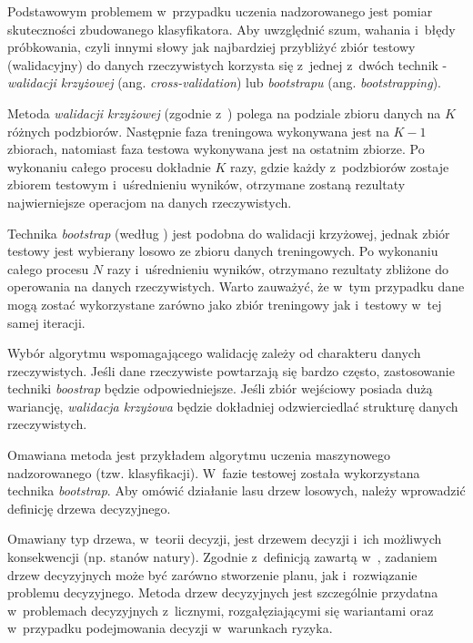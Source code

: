       Podstawowym problemem w~przypadku uczenia nadzorowanego jest pomiar skuteczności zbudowanego klasyfikatora. Aby uwzględnić szum, wahania i~błędy próbkowania, czyli innymi słowy jak najbardziej przybliżyć zbiór testowy (walidacyjny) do danych rzeczywistych korzysta się z~jednej z~dwóch technik - \textit{walidacji krzyżowej} (ang. \textit{cross-validation}) lub \textit{bootstrapu} (ang. \textit{bootstrapping}).

      Metoda \textit{walidacji krzyżowej} (zgodnie z~\cite{StatystyczneSystemyUczaceSie}) polega na podziale zbioru danych na $K$ różnych podzbiorów. Następnie faza treningowa wykonywana jest na $K-1$ zbiorach, natomiast faza testowa wykonywana jest na ostatnim zbiorze. Po wykonaniu całego procesu dokładnie $K$ razy, gdzie każdy z~podzbiorów zostaje zbiorem testowym i~uśrednieniu wyników, otrzymane zostaną rezultaty najwierniejsze operacjom na danych rzeczywistych.

      Technika \textit{bootstrap} (według \cite{StatystyczneSystemyUczaceSie}) jest podobna do walidacji krzyżowej, jednak zbiór testowy jest wybierany losowo ze zbioru danych treningowych. Po wykonaniu całego procesu $N$ razy i~uśrednieniu wyników, otrzymano rezultaty zbliżone do operowania na danych rzeczywistych. Warto zauważyć, że w~tym przypadku dane mogą zostać wykorzystane zarówno jako zbiór treningowy jak i~testowy w~tej samej iteracji.

      Wybór algorytmu wspomagającego walidację zależy od charakteru danych rzeczywistych. Jeśli dane rzeczywiste powtarzają się bardzo często, zastosowanie techniki \textit{boostrap} będzie odpowiedniejsze. Jeśli zbiór wejściowy posiada dużą wariancję, \textit{walidacja krzyżowa} będzie dokładniej odzwierciedlać strukturę danych rzeczywistych.

      Omawiana metoda jest przykładem algorytmu uczenia maszynowego nadzorowanego (tzw. klasyfikacji). W~fazie testowej została wykorzystana technika \textit{bootstrap}. Aby omówić działanie lasu drzew losowych, należy wprowadzić definicję drzewa decyzyjnego.

      Omawiany typ drzewa, w~teorii decyzji, jest drzewem decyzji i~ich możliwych konsekwencji (np. stanów natury). Zgodnie z~definicją zawartą w~\cite{RealTimeRandomizedTrees05}, zadaniem drzew decyzyjnych może być zarówno stworzenie planu, jak i~rozwiązanie problemu decyzyjnego. Metoda drzew decyzyjnych jest szczególnie przydatna w~problemach decyzyjnych z~licznymi, rozgałęziającymi się wariantami oraz w~przypadku podejmowania decyzji w~warunkach ryzyka.

